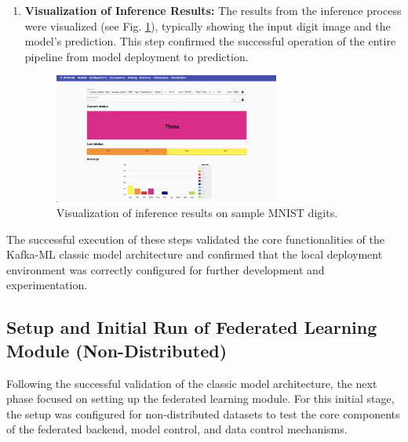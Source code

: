 \begin{enumerate}
    \item \textbf{Visualization of Inference Results:} The results from the inference process were visualized (see Fig. \ref{fig:inference_results6}), typically showing the input digit image and the model's prediction. This step confirmed the successful operation of the entire pipeline from model deployment to prediction.
    \begin{figure}[h!]
        \centering
         \includegraphics[width=0.7\textwidth]{MWP-Project Report Template - BD-ML-June25/screenshots_classic/13_Visualisation.png}
       
        \caption{Visualization of inference results on sample MNIST digits.}
        \label{fig:inference_results6}
    \end{figure}
\end{enumerate}

The successful execution of these steps validated the core functionalities of the Kafka-ML classic model architecture and confirmed that the local deployment environment was correctly configured for further development and experimentation.


\subsection{Setup and Initial Run of Federated Learning Module (Non-Distributed)}
\label{subsec:federated_setup_non_distributed}

Following the successful validation of the classic model architecture, the next phase focused on setting up the federated learning module. For this initial stage, the setup was configured for non-distributed datasets to test the core components of the federated backend, model control, and data control mechanisms.

